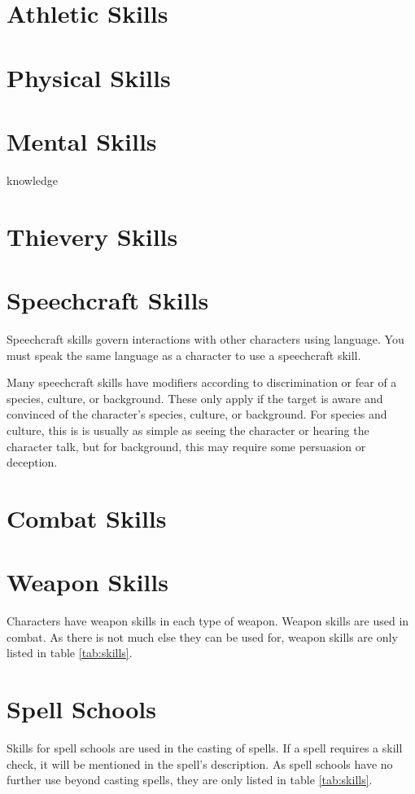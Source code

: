 \begin{multicols*}{2}

    \section{Athletic Skills}

    \section{Physical Skills}

    \section{Mental Skills}
    {knowledge}

    \section{Thievery Skills}

    \section{Speechcraft Skills}\label{speechcraft-skills}
    Speechcraft skills govern interactions with other characters using language.
    You must speak the same language as a character to use a speechcraft skill.

    Many speechcraft skills have modifiers according to discrimination or fear of
    a species, culture, or background. These only apply if the target is aware and
    convinced of the character's species, culture, or background. For species and
    culture, this is is usually as simple as seeing the character or hearing the
    character talk, but for background, this may require some persuasion or
    deception.

    \section{Combat Skills}

    \section{Weapon Skills}\label{weapon-skills}
    Characters have weapon skills in each type of weapon. Weapon skills are used in
    combat. As there is not much else they can be used for, weapon skills are only
    listed in table \ref{tab:skills}.


    \section{Spell Schools}\label{spell-schools}
    Skills for spell schools are used in the casting of spells. If a spell requires
    a skill check, it will be mentioned in the spell's description. As spell
    schools have no further use beyond casting spells, they are only listed in
    table \ref{tab:skills}.
\end{multicols*}

